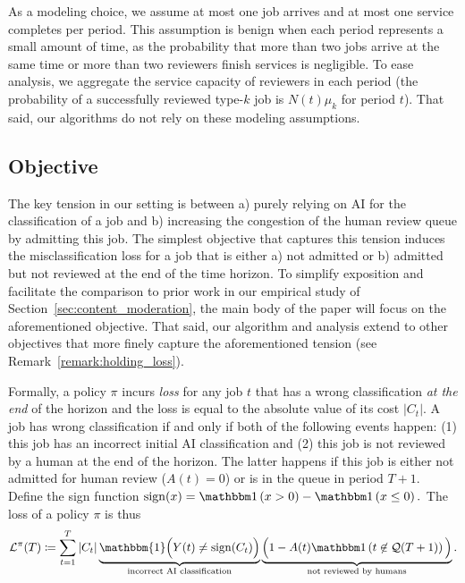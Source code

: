 As a modeling choice, we assume at most one job arrives and at most one service completes per period. This assumption is benign when each period represents a small amount of time, as the probability that more than two jobs arrive at the same time or more than two reviewers finish services is negligible. To ease analysis, we aggregate the service capacity of reviewers in each period (the probability of a successfully reviewed type-$k$ job is $N(t) \mu_k$ for period $t$). That said, our algorithms do not rely on these modeling assumptions.

\subsection{Objective}
The key tension in our setting is between a) purely relying on AI for the classification of a job and b) increasing the congestion of the human review queue by admitting this job. The simplest objective that captures this tension induces the misclassification loss for a job that is either a) not admitted or b) admitted but not reviewed at the end of the time horizon. To simplify exposition and facilitate the comparison to prior work in our empirical study of Section~\ref{sec:content_moderation}, the main body of the paper will focus on the aforementioned objective. That said, our algorithm and analysis extend to other objectives that more finely capture the aforementioned tension (see Remark~\ref{remark:holding_loss}).

Formally, a policy $\pi$ incurs \emph{loss} for any job $t$ that has a wrong classification \emph{at the end} of the horizon and the loss is equal to the absolute value of its cost $|C_t|$. A job has wrong classification if and only if both of the following events happen: (1) this job has an incorrect initial AI classification and (2) this job is not reviewed by a human at the end of the horizon. The latter happens if this job is either not admitted for human review ($A(t) = 0$) or is in the queue in period $T + 1$. Define  the sign function $\sign(x) = \indic{x > 0} - \indic{x \leq 0}.$ The loss of a policy $\pi$ is thus
\begin{equation}\label{eq:policy-loss}
\set{L}^\pi(T) \coloneqq \sum_{t=1}^T |C_t|\underbrace{\mathbbm{1}\Big(Y(t) \neq \sign(C_t)\Big)}_{\text{incorrect AI classification}}\underbrace{\Big(1 - A(t)\indic{t \not \in \set{Q}(T+1)}\Big)}_{\text{not reviewed by humans}}.
\end{equation}

